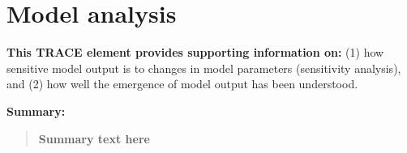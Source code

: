 \documentclass{article}[12pt]
\begin{document}
\section{Model analysis}

\textbf{This TRACE element provides supporting information on:} (1) how sensitive model output is to changes in model parameters (sensitivity analysis), and (2) how well the emergence of model output has been understood. 

\textbf{Summary:}
\begin{verse}
\textbf{
Summary text here
}
\end{verse}
\end{document}
